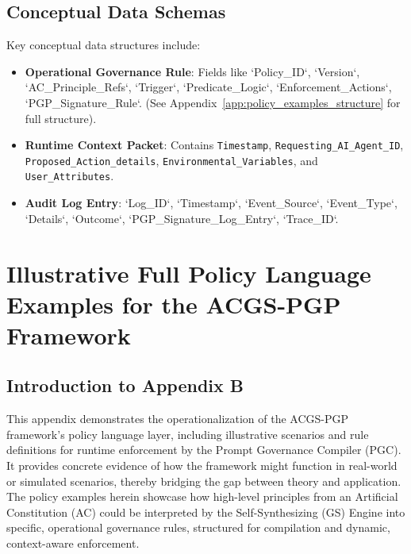 \documentclass[sigconf,review,anonymous=false]{acmart} %
\begin{document}
\subsection{Conceptual Data Schemas}
\label{app:architecture_details_data_schemas}
Key conceptual data structures include:
\begin{itemize}
    \item \textbf{Operational Governance Rule}: Fields like `Policy_ID`, `Version`, `AC_Principle_Refs`, `Trigger`, `Predicate_Logic`, `Enforcement_Actions`, `PGP_Signature_Rule`. (See Appendix~\ref{app:policy_examples_structure} for full structure).
    \item \textbf{Runtime Context Packet}: Contains \texttt{Timestamp}, \texttt{Requesting\_AI\_Agent\_ID}, \texttt{Proposed\_Action\_details}, \texttt{Environmental\_Variables}, and \texttt{User\_Attributes}.
    \item \textbf{Audit Log Entry}: `Log_ID`, `Timestamp`, `Event_Source`, `Event_Type`, `Details`, `Outcome`, `PGP_Signature_Log_Entry`, `Trace_ID`.
\end{itemize}

\section{Illustrative Full Policy Language Examples for the ACGS-PGP Framework}
\label{app:policy_examples}
\subsection{Introduction to Appendix B}
\label{app:policy_examples_intro}
This appendix demonstrates the operationalization of the ACGS-PGP framework's policy language layer, including illustrative scenarios and rule definitions for runtime enforcement by the Prompt Governance Compiler (PGC). It provides concrete evidence of how the framework might function in real-world or simulated scenarios, thereby bridging the gap between theory and application. The policy examples herein showcase how high-level principles from an Artificial Constitution (AC) could be interpreted by the Self-Synthesizing (GS) Engine into specific, operational governance rules, structured for compilation and dynamic, context-aware enforcement.
\end{document}
